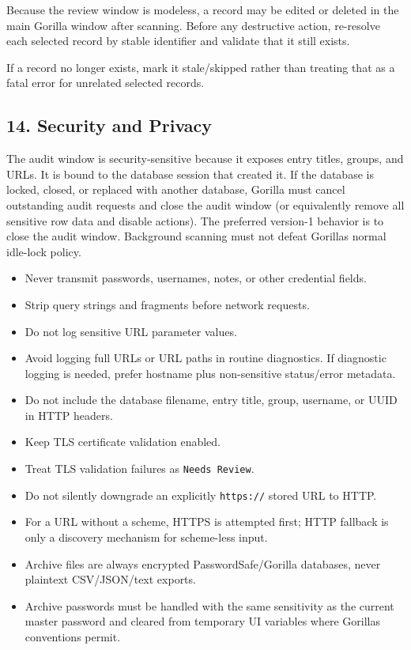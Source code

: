 \documentclass[
  letterpaper,
]{article}
\newcommand{\passthrough}[1]{#1}
\providecommand{\tightlist}{%
  \setlength{\itemsep}{0pt}\setlength{\parskip}{0pt}}
\begin{document}
Because the review window is modeless, a record may be edited or deleted in the main Gorilla window after scanning.
Before any destructive action, re-resolve each selected record by stable identifier and validate that it still exists.

If a record no longer exists, mark it stale/skipped rather than treating that as a fatal error for unrelated selected
records.

\subsection{14. Security and Privacy}\label{14-security-and-privacy}

The audit window is security-sensitive because it exposes entry titles, groups, and URLs. It is bound to the database
session that created it. If the database is locked, closed, or replaced with another database, Gorilla must cancel
outstanding audit requests and close the audit window (or equivalently remove all sensitive row data and disable
actions). The preferred version-1 behavior is to close the audit window. Background scanning must not defeat
Gorilla\textquotesingle s normal idle-lock policy.

\begin{itemize}
\tightlist
\item
  Never transmit passwords, usernames, notes, or other credential fields.
\item
  Strip query strings and fragments before network requests.
\item
  Do not log sensitive URL parameter values.
\item
  Avoid logging full URLs or URL paths in routine diagnostics. If diagnostic logging is needed, prefer hostname plus
  non-sensitive status/error metadata.
\item
  Do not include the database filename, entry title, group, username, or UUID in HTTP headers.
\item
  Keep TLS certificate validation enabled.
\item
  Treat TLS validation failures as \passthrough{\lstinline!Needs Review!}.
\item
  Do not silently downgrade an explicitly \passthrough{\lstinline!https://!} stored URL to HTTP.
\item
  For a URL without a scheme, HTTPS is attempted first; HTTP fallback is only a discovery mechanism for scheme-less
  input.
\item
  Archive files are always encrypted PasswordSafe/Gorilla databases, never plaintext CSV/JSON/text exports.
\item
  Archive passwords must be handled with the same sensitivity as the current master password and cleared from temporary
  UI variables where Gorilla\textquotesingle s conventions permit.
\end{itemize}
\end{document}
